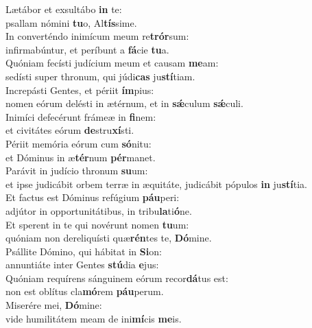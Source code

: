 \evenverse Lætábor et exsultábo \textbf{in} te:~\*\\
\evenverse psallam nómini \textbf{tu}o, Al\textbf{tís}sime.\\
\oddverse In converténdo inimícum meum re\textbf{trór}sum:~\*\\
\oddverse infirmabúntur, et períbunt a \textbf{fá}cie \textbf{tu}a.\\
\evenverse Quóniam fecísti judícium meum et causam \textbf{me}am:~\*\\
\evenverse sedísti super thronum, qui júdi\textbf{cas} ju\textbf{stí}tiam.\\
\oddverse Increpásti Gentes, et périit \textbf{ím}pius:~\*\\
\oddverse nomen eórum delésti in ætérnum, et in \textbf{sǽ}culum \textbf{sǽ}culi.\\
\evenverse Inimíci defecérunt frámeæ in \textbf{fi}nem:~\*\\
\evenverse et civitátes eórum \textbf{de}stru\textbf{xí}sti.\\
\oddverse Périit memória eórum cum \textbf{só}nitu:~\*\\
\oddverse et Dóminus in æ\textbf{tér}num \textbf{pér}manet.\\
\evenverse Parávit in judício thronum \textbf{su}um:~\*\\
\evenverse et ipse judicábit orbem terræ in æquitáte, judicábit pópulos \textbf{in} ju\textbf{stí}tia.\\
\oddverse Et factus est Dóminus refúgium \textbf{páu}peri:~\*\\
\oddverse adjútor in opportunitátibus, in tribu\textbf{la}ti\textbf{ó}ne.\\
\evenverse Et sperent in te qui novérunt nomen \textbf{tu}um:~\*\\
\evenverse quóniam non dereliquísti quæ\textbf{rén}tes te, \textbf{Dó}mine.\\
\oddverse Psállite Dómino, qui hábitat in \textbf{Si}on:~\*\\
\oddverse annuntiáte inter Gentes \textbf{stú}dia \textbf{e}jus:\\
\evenverse Quóniam requírens sánguinem eórum recor\textbf{dá}tus est:~\*\\
\evenverse non est oblítus cla\textbf{mó}rem \textbf{páu}perum.\\
\oddverse Miserére mei, \textbf{Dó}mine:~\*\\
\oddverse vide humilitátem meam de ini\textbf{mí}cis \textbf{me}is.\\
